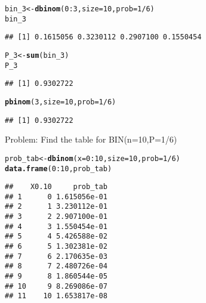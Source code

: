 \documentclass{article}\usepackage[]{graphicx}\usepackage[]{xcolor}
\makeatletter
\newcommand{\hlnum}[1]{\textcolor[rgb]{0.686,0.059,0.569}{#1}}%
\newcommand{\hlopt}[1]{\textcolor[rgb]{0,0,0}{#1}}%
\newcommand{\hldef}[1]{\textcolor[rgb]{0.345,0.345,0.345}{#1}}%
\newcommand{\hlkwb}[1]{\textcolor[rgb]{0.69,0.353,0.396}{#1}}%
\newcommand{\hlkwc}[1]{\textcolor[rgb]{0.333,0.667,0.333}{#1}}%
\newcommand{\hlkwd}[1]{\textcolor[rgb]{0.737,0.353,0.396}{\textbf{#1}}}%
\newenvironment{kframe}{%
 \def\at@end@of@kframe{}%
 \ifinner\ifhmode%
  \def\at@end@of@kframe{\end{minipage}}%
  \begin{minipage}{\columnwidth}%
 \fi\fi%
 \def\FrameCommand##1{\hskip\@totalleftmargin \hskip-\fboxsep
 \colorbox{shadecolor}{##1}\hskip-\fboxsep
     \hskip-\linewidth \hskip-\@totalleftmargin \hskip\columnwidth}%
 \MakeFramed {\advance\hsize-\width
   \@totalleftmargin\z@ \linewidth\hsize
   \@setminipage}}%
 {\par\unskip\endMakeFramed%
 \at@end@of@kframe}
\newenvironment{knitrout}{}{} %
\makeatother
\begin{document}
\begin{knitrout}
\color{fgcolor}\begin{kframe}
\begin{alltt}
\hldef{bin_3} \hlkwb{<-} \hlkwd{dbinom}\hldef{(}\hlnum{0}\hlopt{:}\hlnum{3}\hldef{,}\hlkwc{size}\hldef{=}\hlnum{10}\hldef{,}\hlkwc{prob}\hldef{=}\hlnum{1}\hlopt{/}\hlnum{6}\hldef{)}
\hldef{bin_3}
\end{alltt}
\begin{verbatim}
## [1] 0.1615056 0.3230112 0.2907100 0.1550454
\end{verbatim}
\begin{alltt}
\hldef{P_3} \hlkwb{<-} \hlkwd{sum}\hldef{(bin_3)}
\hldef{P_3}
\end{alltt}
\begin{verbatim}
## [1] 0.9302722
\end{verbatim}
\begin{alltt}
\hlkwd{pbinom}\hldef{(}\hlnum{3}\hldef{,}\hlkwc{size}\hldef{=}\hlnum{10}\hldef{,}\hlkwc{prob}\hldef{=}\hlnum{1}\hlopt{/}\hlnum{6}\hldef{)}
\end{alltt}
\begin{verbatim}
## [1] 0.9302722
\end{verbatim}
\end{kframe}
\end{knitrout}
Problem: \newline
Find the table for BIN(n=10,P=1/6)
\begin{knitrout}
\color{fgcolor}\begin{kframe}
\begin{alltt}
\hldef{prob_tab} \hlkwb{<-} \hlkwd{dbinom}\hldef{(}\hlkwc{x} \hldef{=} \hlnum{0}\hlopt{:}\hlnum{10}\hldef{,} \hlkwc{size} \hldef{=} \hlnum{10}\hldef{,} \hlkwc{prob} \hldef{=} \hlnum{1}\hlopt{/}\hlnum{6}\hldef{)}
\hlkwd{data.frame}\hldef{(}\hlnum{0}\hlopt{:}\hlnum{10}\hldef{, prob_tab)}
\end{alltt}
\begin{verbatim}
##    X0.10     prob_tab
## 1      0 1.615056e-01
## 2      1 3.230112e-01
## 3      2 2.907100e-01
## 4      3 1.550454e-01
## 5      4 5.426588e-02
## 6      5 1.302381e-02
## 7      6 2.170635e-03
## 8      7 2.480726e-04
## 9      8 1.860544e-05
## 10     9 8.269086e-07
## 11    10 1.653817e-08
\end{verbatim}
\end{kframe}
\end{knitrout}
\end{document}
